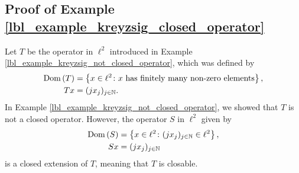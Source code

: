 \subsection{Proof of Example \eqref{lbl_example_kreyzsig_closed_operator}}\label{proof_lbl_example_kreyzsig_closed_operator}

\begin{example}
  Let $T$ be the operator in $\ell^2$ introduced in Example \eqref{lbl_example_kreyzsig_not_closed_operator}, which was defined by
  \begin{align*}
    \operatorname{Dom}\left(T\right) &= \left\{x \in \ell^2 \colon \text{$x$ has finitely many non-zero elements}\right\}, \\
    Tx &= (jx_j)_{j \in \mathbb{N}}.
  \end{align*}
  In Example \eqref{lbl_example_kreyzsig_not_closed_operator}, we showed that $T$ is not a closed operator. However, the operator $S$ in $\ell^2$ given by
  \begin{align*}
    \operatorname{Dom}\left(S\right) &= \left\{x \in \ell^2 \colon (jx_j)_{j \in \mathbb{N}} \in \ell^2\right\}, \\
    Sx &= (jx_j)_{j \in \mathbb{N}}
  \end{align*}
  is a closed extension of $T$, meaning that $T$ is closable.
\end{example}
